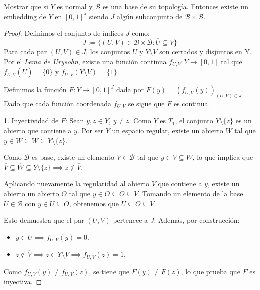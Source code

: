 \documentclass{article}
\theoremstyle{plain}
\theoremstyle{definition}
\newcommand{\cl}[1]{\overline{#1}}              %
\newenvironment{ejercicio}[1]{\begin{trivlist}
\item[\hskip \labelsep {\bfseries Ejercicio}\hskip \labelsep {\bfseries #1.}]}{\end{trivlist}}
\begin{document}
\begin{ejercicio}{9}
    Mostrar que si \( Y \) es normal y \( \mathcal{B} \) es una base de su topología. Entonces existe un embedding de \( Y \) en \( {[0,1]}^J \) siendo \( J \) algún subconjunto de \( \mathcal{B} \times \mathcal{B} \).
\end{ejercicio}
\begin{proof}
    Definimos el conjunto de índices \( J \) como:
    \[
        J := \{ (U, V) \in \mathcal{B} \times \mathcal{B} : \cl{U} \subseteq V \}
    \]
    Para cada par \( (U,V) \in J \), los conjuntos \( \cl{U} \) y \( Y \setminus V \) son cerrados y disjuntos en Y. Por el \emph{Lema de Urysohn}, existe una función continua \( f_{U,V} : Y \to [0,1] \) tal que \( f_{U,V}(\cl{U}) = \{0\} \) y \( f_{U,V}(Y \setminus V) = \{1\} \).

    Definimos la función \( F : Y \to {[0, 1]}^J \) dada por \( F(y) = {\left( f_{U, V}(y) \right)}_{(U, V) \in J} \).
    Dado que cada función coordenada \( f_{U, V} \) se sigue que \( F \) es continua.

    1. Inyectividad de \( F \):
    Sean \( y, z \in Y \), \( y \neq z \). Como \( Y \) es \( T_1 \), el conjunto \( Y \setminus \{ z \} \) es un abierto que contiene a \( y \).
    Por ser \( Y \) un espacio regular, existe un abierto \( W \) tal que \( y \in W \subseteq \cl{W} \subseteq Y \setminus \{z\} \).

    Como \( \mathcal{B} \) es base, existe un elemento \( V \in \mathcal{B} \) tal que \( y \in V \subseteq W \), lo que implica que \( \cl{V} \subseteq \cl{W} \subseteq Y \setminus \{z\} \implies z \notin \cl{V} \).

    Aplicando nuevamente la regularidad al abierto \( V \) que contiene a \( y \), existe un abierto un abierto \( O \) tal que \( y \in O \subseteq \cl{O} \subseteq V \).
    Tomando un elemento de la base \( U \in \mathcal{B} \) con \( y \in U \subseteq O \), obtenemos que \( \cl{U} \subseteq \cl{O} \subseteq V \).

    Esto demuestra que el par \( (U, V) \) pertenece a \( J \). Además, por construcción:
    \begin{itemize}
        \item \( y \in U \implies f_{U, V}(y) = 0 \).
        \item \( z \notin \cl{V} \implies z \in Y \setminus V \implies f_{U, V}(z) = 1 \).
    \end{itemize}
    Como \( f_{U, V}(y) \neq f_{U, V}(z) \), se tiene que \( F(y) \neq F(z) \), lo que prueba que \( F \) es inyectiva.


\end{proof}
\end{document}
